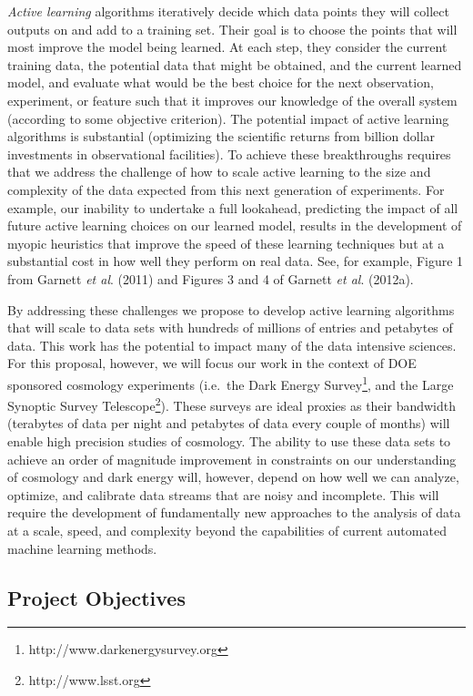 \documentclass[prd,nofootbib,floatfix,11pt,tightenlines]{revtex4}
\begin{document}
{\it Active learning} algorithms iteratively decide which data
points they will collect outputs on and add to a training set.  Their
goal is to choose the points that will most improve the model being
learned.  At each step, they consider the current training data, the
potential data that might be obtained, and the current learned model,
and evaluate what would be the best choice for the next observation,
experiment, or feature such that it improves our knowledge of the
overall system (according to some objective criterion). The potential
impact of active learning algorithms is substantial (optimizing the
scientific returns from billion dollar investments in observational
facilities). To achieve these breakthroughs requires that we address
the challenge of how to scale active learning to the size and
complexity of the data expected from this next generation of
experiments.  For example, our inability to undertake a full 
lookahead, predicting the impact of all future active learning choices
on our learned model, results in the
development of myopic heuristics that improve the speed of these
learning techniques but at a substantial cost in how well they perform
on real data.  See, for example, 
Figure 1 from Garnett {\it et al}. (2011) and Figures
3 and 4 of Garnett {\it et al}. (2012a).

By addressing these challenges we propose to develop active learning
algorithms that will scale to data sets with hundreds of millions of
entries and petabytes of data. This work has the potential to impact
many of the data intensive sciences. For this proposal, however, we
will focus our work in the context of DOE sponsored cosmology
experiments (i.e.\ the Dark Energy
Survey\footnote{http://www.darkenergysurvey.org}, and the Large
Synoptic Survey Telescope\footnote{http://www.lsst.org}). These
surveys are ideal proxies as their bandwidth (terabytes of data per
night and petabytes of data every couple of months) will enable high
precision studies of cosmology. The ability to use these data sets to
achieve an order of magnitude improvement in constraints on our
understanding of cosmology and dark energy will, however, depend on
how well we can analyze, optimize, and calibrate data streams that are
noisy and incomplete. This will require the development of
fundamentally new approaches to the analysis of data at a scale,
speed, and complexity beyond the capabilities of current automated
machine learning methods.

\subsection{Project Objectives}
\label{sec:objectives}
\end{document}
